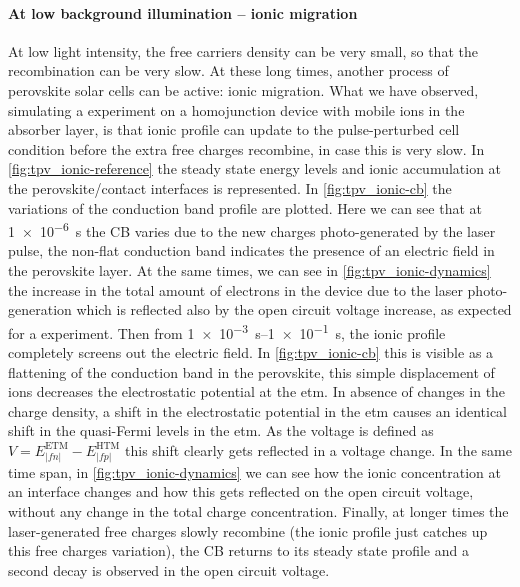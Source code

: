 		\paragraph{At low background illumination -- ionic migration}\label{tpv_biexp_lowlight_ions}
		At low light intensity, the free carriers density can be very small, so that the recombination can be very slow.
		At these long times, another process of perovskite solar cells can be active: ionic migration.
		What we have observed, simulating a  experiment on a homojunction device with mobile ions in the absorber layer, is that ionic profile can update to the pulse\hyp{}perturbed cell condition before the extra free charges recombine, in case this is very slow.
		In \cref{fig:tpv_ionic-reference} the steady state energy levels and ionic accumulation at the perovskite/contact interfaces is represented.
		In \cref{fig:tpv_ionic-cb} the variations of the conduction band profile are plotted.
		Here we can see that at \SI{1e-6}{s} the CB varies due to the new charges photo\hyp{}generated by the laser pulse, the non-flat conduction band indicates the presence of an electric field in the perovskite layer.
		At the same times, we can see in \cref{fig:tpv_ionic-dynamics} the increase in the total amount of electrons in the device due to the laser photo-generation which is reflected also by the open circuit voltage increase, as expected for a  experiment.
		Then from \SIrange{1e-3}{1e-1}{s}, the ionic profile completely screens out the electric field.
		In \cref{fig:tpv_ionic-cb} this is visible as a flattening of the conduction band in the perovskite, this simple displacement of ions decreases the electrostatic potential at the \gls{etm}.
		In absence of changes in the charge density, a shift in the electrostatic potential in the \gls{etm} causes an identical shift in the quasi-Fermi levels in the \gls{etm}.
		As the voltage is defined as $V = E_|fn|^{\mathrm{ETM}} - E_|fp|^{\mathrm{HTM}}$ this shift clearly gets reflected in a voltage change.
		In the same time span, in \cref{fig:tpv_ionic-dynamics} we can see how the ionic concentration at an interface changes and how this gets reflected on the open circuit voltage, without any change in the total charge concentration.
		Finally, at longer times the laser\hyp{}generated free charges slowly recombine (the ionic profile just catches up this free charges variation), the CB returns to its steady state profile and a second decay is observed in the open circuit voltage.
